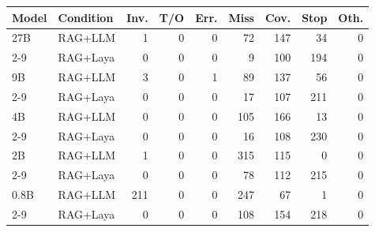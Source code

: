 \begin{tabular}{|l|l|r|r|r|r|r|r|r|}
\hline
Model & Condition & Inv. & T/O & Err. & Miss & Cov. & Stop & Oth. \\
\hline
27B & RAG+LLM & 1 & 0 & 0 & 72 & 147 & 34 & 0 \\ %
\cline{2-9}
 & RAG+Laya & 0 & 0 & 0 & 9 & 100 & 194 & 0 \\ %
\hline
9B & RAG+LLM & 3 & 0 & 1 & 89 & 137 & 56 & 0 \\ %
\cline{2-9}
 & RAG+Laya & 0 & 0 & 0 & 17 & 107 & 211 & 0 \\ %
\hline
4B & RAG+LLM & 0 & 0 & 0 & 105 & 166 & 13 & 0 \\ %
\cline{2-9}
 & RAG+Laya & 0 & 0 & 0 & 16 & 108 & 230 & 0 \\ %
\hline
2B & RAG+LLM & 1 & 0 & 0 & 315 & 115 & 0 & 0 \\ %
\cline{2-9}
 & RAG+Laya & 0 & 0 & 0 & 78 & 112 & 215 & 0 \\ %
\hline
0.8B & RAG+LLM & 211 & 0 & 0 & 247 & 67 & 1 & 0 \\ %
\cline{2-9}
 & RAG+Laya & 0 & 0 & 0 & 108 & 154 & 218 & 0 \\ %
\hline
\end{tabular}
